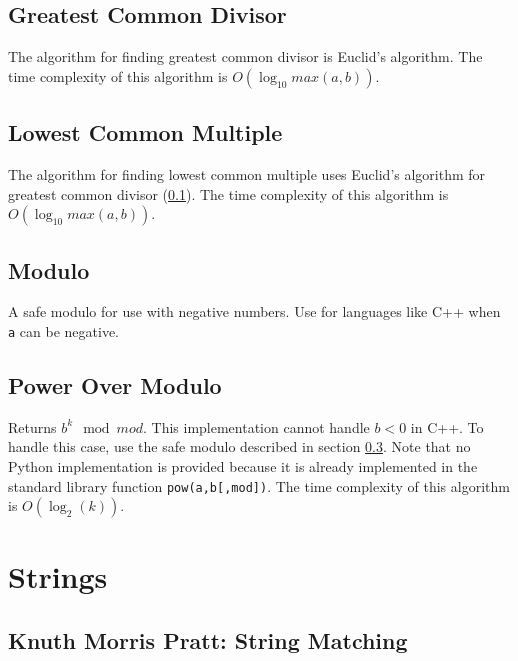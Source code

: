 \documentclass[letterpaper,11pt,twoside]{article}
\begin{document}
            \subsection{Greatest Common Divisor} \label{gcd}
                The algorithm for finding greatest common divisor is Euclid's algorithm.
                The time complexity of this algorithm is $O(\log_{10} max(a,b))$.
                
                
            \subsection{Lowest Common Multiple}
                The algorithm for finding lowest common multiple uses Euclid's algorithm for greatest common divisor (\ref{gcd}).
                The time complexity of this algorithm is $O(\log_{10} max(a,b))$.
                
                
            \subsection{Modulo} \label{modulo}
                A safe modulo for use with negative numbers.
                Use for languages like C++ when \verb|a| can be negative.
                
            \subsection{Power Over Modulo} \label{power}
                Returns $b^{k} \mod mod$.
                This implementation cannot handle $b < 0$ in C++.
                To handle this case, use the safe modulo described in section \ref{modulo}.
                Note that no Python implementation is provided because it is already implemented in the standard library function \verb|pow(a,b[,mod])|.
                The time complexity of this algorithm is $O(\log_{2}(k))$.
                
        \section{Strings}
            \subsection{Knuth Morris Pratt: String Matching} \label{kmp}
\end{document}
